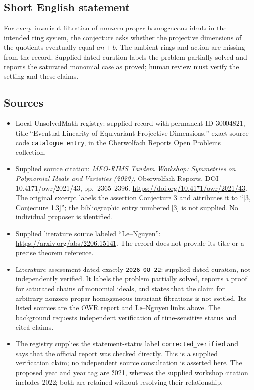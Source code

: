 \documentclass[11pt]{article}
\begin{document}
\subsection{Short English statement}
For every invariant filtration of nonzero proper homogeneous ideals in the intended ring system, the conjecture asks whether the projective dimensions of the quotients eventually equal \(an+b\). The ambient rings and action are missing from the record. Supplied dated curation labels the problem partially solved and reports the saturated monomial case as proved; human review must verify the setting and these claims.
\subsection{Sources}
\begin{itemize}
\item Local UnsolvedMath registry: supplied record with permanent ID \(30004821\), title ``Eventual Linearity of Equivariant Projective Dimensions,'' exact source code \texttt{catalogue entry}, in the Oberwolfach Reports Open Problems collection.
\item Supplied source citation: \emph{MFO-RIMS Tandem Workshop: Symmetries on Polynomial Ideals and Varieties (2022)}, Oberwolfach Reports, DOI 10.4171/owr/2021/43, pp.\ 2365--2396. \url{https://doi.org/10.4171/owr/2021/43}. The original excerpt labels the assertion Conjecture 3 and attributes it to ``[3, Conjecture 1.3]''; the bibliographic entry numbered [3] is not supplied. No individual proposer is identified.
\item Supplied literature source labeled ``Le--Nguyen'': \url{https://arxiv.org/abs/2206.15141}. The record does not provide its title or a precise theorem reference.
\item Literature assessment dated exactly \texttt{2026-08-22}: supplied dated curation, not independently verified. It labels the problem partially solved, reports a proof for saturated chains of monomial ideals, and states that the claim for arbitrary nonzero proper homogeneous invariant filtrations is not settled. Its listed sources are the OWR report and Le--Nguyen links above. The background requests independent verification of time-sensitive status and cited claims.
\item The registry supplies the statement-status label \texttt{corrected\_verified} and says that the official report was checked directly. This is a supplied verification claim; no independent source consultation is asserted here. The proposed year and year tag are 2021, whereas the supplied workshop citation includes 2022; both are retained without resolving their relationship.
\end{itemize}
\end{document}
